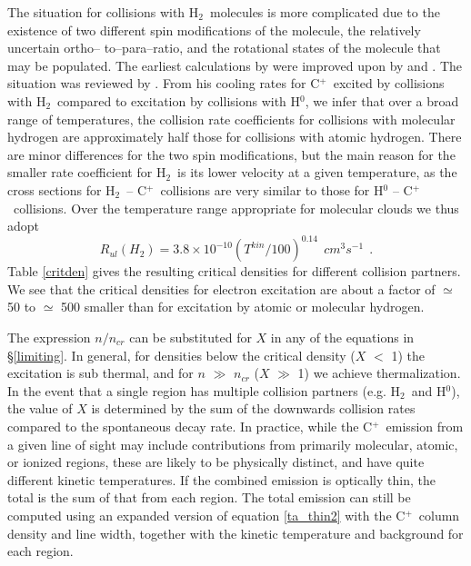 \documentclass[12pt]{aastex}
\def \lp{\>\> .}
\def \hh{H$_2$}
\def \cp{C$^+$}
\def \be{\begin{equation}}
\def \ee{   \end{equation}}
\def \lp{\>\> .}
\begin{document}
The situation for collisions with \hh\ molecules is more complicated due to the existence of two different spin modifications of the molecule, the relatively uncertain ortho-- to--para--ratio, and the rotational states of the molecule that may be populated.
The earliest calculations by \cite{chu1975} were improved upon by \cite{flower1977} and \citet{flower1988}.  
The situation was reviewed by \citet{flower1990}.  
From his cooling rates for \cp\ excited by collisions with \hh\ compared to excitation by collisions with H$^0$, we infer that over a broad range of temperatures, the collision rate coefficients for collisions with molecular hydrogen are approximately half those for collisions with atomic hydrogen.  There are minor differences for the two spin modifications, but the main reason for the smaller rate coefficient for \hh\ is its lower velocity at a given temperature, as the cross sections for \hh\ -- \cp\ collisions are very similar to those for H$^0$ -- \cp\ collisions.  
Over the temperature range appropriate for molecular clouds we thus adopt
\be
R_{ul}(H_2) = 3.8\times10^{-10} (T^{kin}/100)^{0.14} ~~cm^3s^{-1} \lp
\ee
Table \ref{critden} gives the resulting critical densities for different collision partners.  
We see that the critical densities for electron excitation are about a factor of $\simeq$ 50 to $\simeq$ 500  smaller than for excitation by atomic or molecular hydrogen.  



The expression $n/n_{cr}$ can be substituted for $X$ in any of the equations in \S\ref{limiting}.  
In general, for densities below the critical density ($X$ $<$ 1) the excitation is sub thermal, and for $n$ $\gg$ $n_{cr}$ ($X$ $\gg$ 1) we achieve thermalization.  
In the event that a single region has multiple collision partners (e.g. \hh\ and H$^0$), the value of $X$ is determined by the sum of the downwards collision rates compared to the spontaneous decay rate.
In practice, while the \cp\ emission from a given line of sight may include contributions from primarily molecular, atomic, or ionized regions, these are likely to be physically distinct, and have quite different kinetic temperatures.  
If the combined emission is optically thin, the total is the sum of that from each region. 
The total emission can still be computed using an expanded version of equation \ref{ta_thin2} with the \cp\ column density and line width, together with the kinetic temperature and background for each region.  
\end{document}
